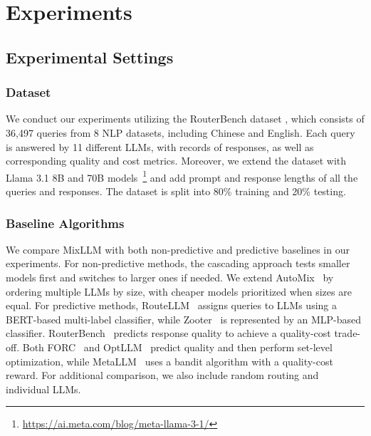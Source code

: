 \section{Experiments}


\subsection{Experimental Settings}
\subsubsection{Dataset}
We conduct our experiments utilizing the RouterBench dataset \cite{hu2024routerbench}, which consists of 36,497 queries from 8 NLP datasets, including Chinese and English. 
Each query is answered by 11 different LLMs, with records of responses, as well as corresponding quality and cost metrics.
Moreover, we extend the dataset with Llama 3.1 8B and 70B models~\footnote{\url{https://ai.meta.com/blog/meta-llama-3-1/}} and add prompt and response lengths of all the queries and responses. The dataset is split into 80\% training and 20\% testing. 


\subsubsection{Baseline Algorithms}
We compare MixLLM with both non-predictive and predictive baselines in our experiments. 
For non-predictive methods, the cascading approach tests smaller models first and switches to larger ones if needed. We extend AutoMix~\cite{madaan2023automix} by ordering multiple LLMs by size, with cheaper models prioritized when sizes are equal.
For predictive methods, 
RouteLLM~\cite{ong2024routellm} assigns queries to LLMs using a BERT-based multi-label classifier, while  Zooter~\cite{lu-etal-2024-routing} is represented by an MLP-based classifier.
RouterBench~\cite{hu2024routerbench} predicts response quality to achieve a quality-cost trade-off.
Both FORC~\cite{vsakota2024fly} and OptLLM~\cite{liu2024optllm} predict quality and then perform set-level optimization,
while MetaLLM~\cite{nguyen2024metallm} uses a bandit algorithm with a quality-cost reward.
For additional comparison, we also include random routing and individual LLMs.

